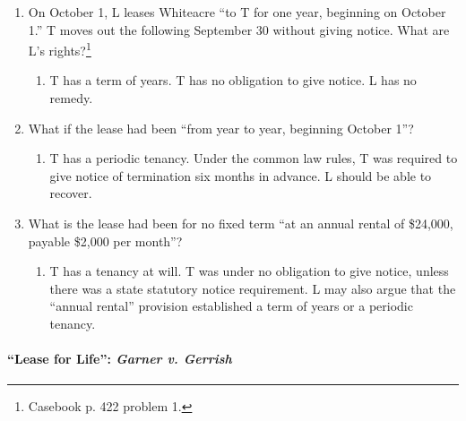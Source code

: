 \begin{enumerate}
    \item On October 1, L leases Whiteacre ``to T for one year, beginning on 
    October 1.'' T moves out the following September 30 without giving notice. 
    What are L's rights?\footnote{Casebook p. 422 problem 1.}
    \begin{enumerate}
        \item T has a term of years. T has no obligation to give notice. L has 
        no remedy.
    \end{enumerate}
    \item What if the lease had been ``from year to year, beginning October 1''?
    \begin{enumerate}
        \item T has a periodic tenancy. Under the common law rules, T was 
        required to give notice of termination six months in advance. L should 
        be able to recover. %
    \end{enumerate}
    \item What is the lease had been for no fixed term ``at an annual rental 
    of \$24,000, payable \$2,000 per month''?
    \begin{enumerate}
        \item T has a tenancy at will. T was under no obligation to give 
        notice, unless there was a state statutory notice requirement. L may 
        also argue that the ``annual rental'' provision established a term of 
        years or a periodic tenancy.
    \end{enumerate}
\end{enumerate}

\paragraph{``Lease for Life'': \emph{Garner v. Gerrish}}

